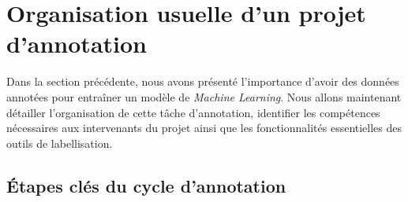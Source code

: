 \section{Organisation usuelle d'un projet d'annotation}
\label{section:2.2-ORGANISATION-ANNOTATION}
	
	Dans la section précédente, nous avons présenté l'importance d'avoir des données annotées pour entraîner un modèle de \textit{Machine Learning}.
	Nous allons maintenant détailler l'organisation de cette tâche d'annotation, identifier les compétences nécessaires aux intervenants du projet ainsi que les fonctionnalités essentielles des outils de labellisation.
	
	
	\subsection{Étapes clés du cycle d'annotation}
	\label{section:2.2.1-ORGANISATION-ANNOTATION-ETAPES-CLES}
		
